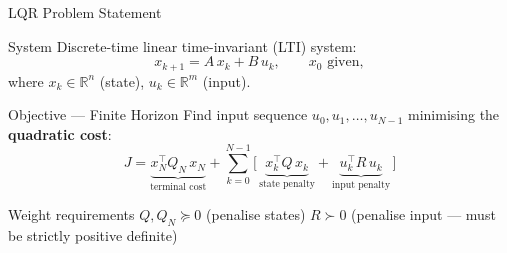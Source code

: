 \documentclass[aspectratio=169,11pt]{beamer}
\newcommand{\R}{\mathbb{R}}
\newcommand{\T}{\top}
\begin{document}
\begin{frame}[shrink=3]{LQR Problem Statement}
\begin{block}{System}
Discrete-time linear time-invariant (LTI) system:
\[
  x_{k+1} = A\,x_k + B\,u_k, \qquad x_0 \text{ given},
\]
where $x_k \in \R^n$ (state), $u_k \in \R^m$ (input).
\end{block}

\begin{block}{Objective --- Finite Horizon}
Find input sequence $u_0, u_1, \ldots, u_{N-1}$ minimising the \textbf{quadratic cost}:
\[
  J = \underbrace{x_N^\T Q_N\, x_N}_{\text{terminal cost}}
    + \sum_{k=0}^{N-1} \bigl[\,
      \underbrace{x_k^\T Q\, x_k}_{\text{state penalty}}
    + \underbrace{u_k^\T R\, u_k}_{\text{input penalty}}
    \,\bigr]
\]
\end{block}

\begin{block}{Weight requirements}
$Q, Q_N \succeq 0$ (penalise states) \qquad $R \succ 0$ (penalise input --- must be strictly positive definite)
\end{block}
\end{frame}
\end{document}
